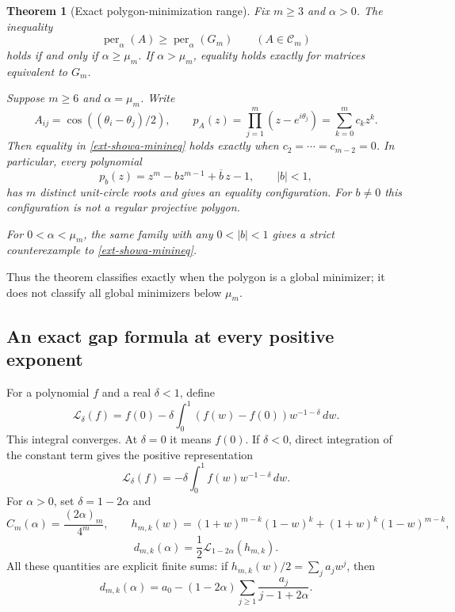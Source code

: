\documentclass[11pt,a4paper]{article}
\newtheorem{theorem}{Theorem}[section]
\theoremstyle{definition}\newtheorem{definition}[theorem]{Definition}
\theoremstyle{remark}\newtheorem{remark}[theorem]{Remark}
\numberwithin{equation}{section}
\begin{document}
\begin{theorem}[Exact polygon-minimization range]
\label{ext-showa-minimum}
Fix $m\ge3$ and $\alpha>0$. The inequality
\begin{equation}\label{ext-showa-minineq}
 \operatorname{per}_{\alpha}(A)\ge
 \operatorname{per}_{\alpha}(G_m)\qquad(A\in\mathcal C_m)
\end{equation}
holds if and only if $\alpha\ge\mu_m$.
If $\alpha>\mu_m$, equality holds exactly for matrices equivalent to $G_m$.

Suppose $m\ge6$ and $\alpha=\mu_m$. Write
\[
 A_{ij}=\cos((\theta_i-\theta_j)/2),\qquad
 p_A(z)=\prod_{j=1}^m(z-e^{i\theta_j})
       =\sum_{k=0}^m c_kz^k.
\]
Then equality in \eqref{ext-showa-minineq} holds exactly when
$c_2=\cdots=c_{m-2}=0$. In particular, every polynomial
\begin{equation}\label{ext-showa-blaschke-family}
 p_b(z)=z^m-bz^{m-1}+\overline b\,z-1,
 \qquad |b|<1,
\end{equation}
has $m$ distinct unit-circle roots and gives an equality configuration.
For $b\ne0$ this configuration is not a regular projective polygon.

For $0<\alpha<\mu_m$, the same family with any $0<|b|<1$ gives a strict
counterexample to \eqref{ext-showa-minineq}.
\end{theorem}

Thus the theorem classifies exactly when the polygon is a global minimizer;
it does not classify all global minimizers below $\mu_m$.

\subsection{An exact gap formula at every positive exponent}

For a polynomial $f$ and a real $\delta<1$, define
\[
 \mathcal L_\delta(f)=f(0)-\delta\int_0^1
       (f(w)-f(0))w^{-1-\delta}\,dw.
\]
This integral converges. At $\delta=0$ it means $f(0)$. If $\delta<0$,
direct integration of the constant term gives the positive representation
\begin{equation}\label{ext-showa-positivefunctional}
 \mathcal L_\delta(f)=-\delta\int_0^1 f(w)w^{-1-\delta}\,dw.
\end{equation}
For $\alpha>0$, set $\delta=1-2\alpha$ and
\[
 C_m(\alpha)=\frac{(2\alpha)_m}{4^m},\qquad
 h_{m,k}(w)=(1+w)^{m-k}(1-w)^k+(1+w)^k(1-w)^{m-k},
\]
\begin{equation}\label{ext-showa-weights}
 d_{m,k}(\alpha)=\frac12\mathcal L_{1-2\alpha}(h_{m,k}).
\end{equation}
All these quantities are explicit finite sums: if
$h_{m,k}(w)/2=\sum_j a_jw^j$, then
\[
 d_{m,k}(\alpha)=a_0-(1-2\alpha)
        \sum_{j\ge1}\frac{a_j}{j-1+2\alpha}.
\]
\end{document}
